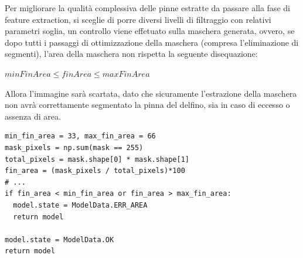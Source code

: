 \documentclass[a4paper,12pt]{report}
\begin{document}
    Per migliorare la qualità complessiva delle pinne estratte da passare alla fase di feature extraction,
    si sceglie di porre diversi livelli di filtraggio con relativi parametri soglia,
    un controllo viene effetuato sulla maschera generata, ovvero, se 
    dopo tutti i passaggi di ottimizzazione della maschera (compresa l'eliminazione di
    segmenti), l'area della maschera non rispetta la seguente disequazione:
    \begin{minipage}{1\textwidth}
      \centering
      $minFinArea \leq finArea \leq maxFinArea$
    \end{minipage}
    
    Allora l'immagine sarà scartata, dato che sicuramente l'estrazione della maschera
    non avrà correttamente segmentato la pinna del delfino, sia in caso di eccesso o assenza di area.
    
    \begin{lstlisting}
min_fin_area = 33, max_fin_area = 66
mask_pixels = np.sum(mask == 255)
total_pixels = mask.shape[0] * mask.shape[1]
fin_area = (mask_pixels / total_pixels)*100
# ...
if fin_area < min_fin_area or fin_area > max_fin_area:
  model.state = ModelData.ERR_AREA
  return model

model.state = ModelData.OK
return model
    \end{lstlisting}
    \newpage
   
\end{document}
